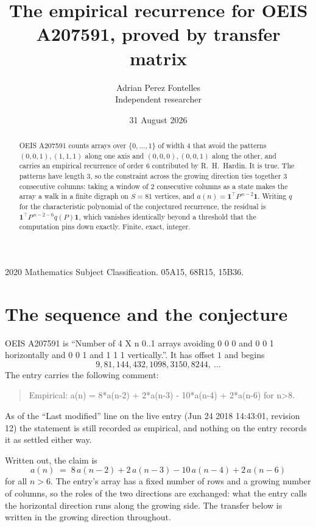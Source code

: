 \documentclass[11pt,a4paper]{article}
\title{The empirical recurrence for OEIS A207591, proved by transfer matrix}
\author{Adrian Perez Fontelles\\ \small Independent researcher}
\date{31 August 2026}
\theoremstyle{plain}
\theoremstyle{definition}
\begin{document}
\maketitle

\begin{abstract}
OEIS A207591 counts arrays over $\{0,\dots,1\}$ of width $4$ that avoid the patterns
$(0,0,1), (1,1,1)$ along one axis and $(0,0,0), (0,0,1)$ along the other, and carries an empirical recurrence of
order $6$ contributed by R.~H.~Hardin. It is true. The patterns have length $3$, so
the constraint across the growing direction ties together $3$ consecutive columns: taking a
window of $2$ consecutive columns as a state makes the array a walk in a finite digraph
on $S=81$ vertices, and $a(n)=\mathbf{1}^{\!\top}P^{\,n-2}\mathbf{1}$. Writing $q$
for the characteristic polynomial of the conjectured recurrence, the residual is
$\mathbf{1}^{\!\top}P^{\,n-2-6}q(P)\mathbf{1}$, which vanishes identically
beyond a threshold that the computation pins down exactly. Finite, exact, integer.
\end{abstract}

\noindent\small 2020 Mathematics Subject Classification. 05A15, 68R15, 15B36.\normalsize

\section{The sequence and the conjecture}

OEIS A207591 is ``Number of 4 X n 0..1 arrays avoiding 0 0 0 and 0 0 1 horizontally and 0 0 1 and 1 1 1 vertically.''. It has offset
$1$ and begins
\[
9, 81, 144, 432, 1098, 3150, 8244,\ \dots
\]
The entry carries the following comment:
\begin{quote}\small
Empirical: a(n) = 8*a(n-2) + 2*a(n-3) - 10*a(n-4) + 2*a(n-6) for n>8.
\end{quote}
As of the ``Last modified'' line on the live entry (Jun 24 2018 14:43:01, revision
12) the statement is still recorded as empirical, and nothing on the entry
records it as settled either way.

Written out, the claim is
\begin{equation}\label{eq:conj}
a(n)\;=\;8\,a(n-2) + 2\,a(n-3) - 10\,a(n-4) + 2\,a(n-6)
\end{equation}
for all $n>6$. The entry's array has a fixed number of rows and a growing number of
columns, so the roles of the two directions are exchanged: what the entry calls the
horizontal direction runs along the growing side. The transfer below is written in the
growing direction throughout.
\end{document}
